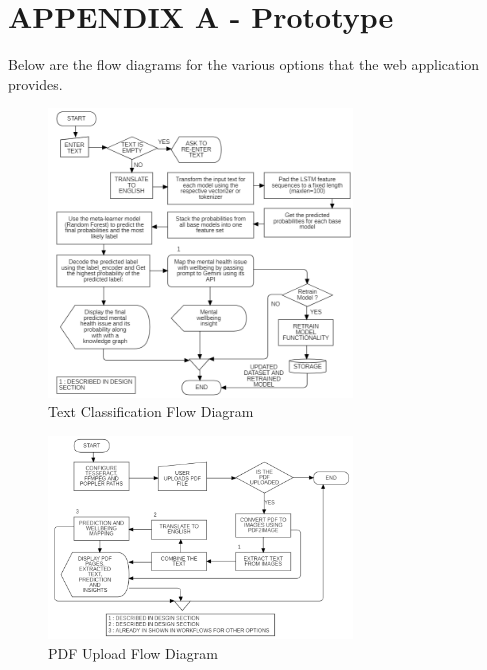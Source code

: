 

\section*{APPENDIX A - Prototype \label{sec:proto}}

\noindent
Below are the flow diagrams for the various options that the web application provides.

\begin{figure}[h!]  
    \centering
    \includegraphics[width=0.72\textwidth]{Images/APP TEXT OPTION.png}  
    \caption*{Text Classification Flow Diagram}
    \label{012i}  %
\end{figure}

\begin{figure}[h!]  
    \centering
    \includegraphics[width=0.72\textwidth]{Images/APP PDF.png}  
    \caption*{PDF Upload Flow Diagram}
    \label{01234i}  %
\end{figure}

